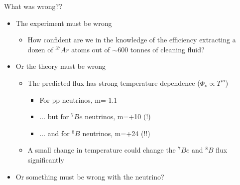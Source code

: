 \begin{frame}[t]{What was wrong??}

\begin{itemize}
  \item {\color{red} The experiment must be wrong}
  \begin{itemize}
     \item How confident are we in the knowledge of the efficiency extracting a dozen
       of $^{37}Ar$ atoms out of $\sim$600 tonnes of cleaning fluid?
  \end{itemize}
  \item {\color{red} Or the theory must be wrong}
  \begin{itemize}
     \item The predicted flux has strong temperature dependence ($\Phi_{\nu} \propto T^{m}$)
        \begin{itemize}
           \item For pp neutrinos, m=-1.1
           \item ... but for $^{7}Be$ neutrinos, m=+10 (!)
           \item ... and for $^{8}B$ neutrinos, m=+24 (!!)
        \end{itemize}
     \item A small change in temperature could change the $^{7}Be$ and $^{8}B$ flux significantly
  \end{itemize}
  \item {\color{blue} Or something must be wrong with the neutrino?}
\end{itemize}
\end{frame}


